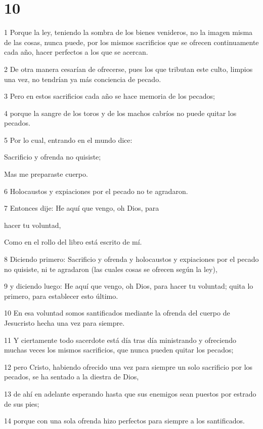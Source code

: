 \chapter{10}

\par 1 Porque la ley, teniendo la sombra de los bienes venideros, no la imagen misma de las cosas, nunca puede, por los mismos sacrificios que se ofrecen continuamente cada año, hacer perfectos a los que se acercan.
\par 2 De otra manera cesarían de ofrecerse, pues los que tributan este culto, limpios una vez, no tendrían ya más conciencia de pecado.
\par 3 Pero en estos sacrificios cada año se hace memoria de los pecados;
\par 4 porque la sangre de los toros y de los machos cabríos no puede quitar los pecados.
\par 5 Por lo cual, entrando en el mundo dice:
\par Sacrificio y ofrenda no quisiste;
\par Mas me preparaste cuerpo.
\par 6 Holocaustos y expiaciones por el pecado no te agradaron.
\par 7 Entonces dije: He aquí que vengo, oh Dios, para
\par hacer tu voluntad,
\par Como en el rollo del libro está escrito de mí.
\par 8 Diciendo primero: Sacrificio y ofrenda y holocaustos y expiaciones por el pecado no quisiste, ni te agradaron (las cuales cosas se ofrecen según la ley),
\par 9 y diciendo luego: He aquí que vengo, oh Dios, para hacer tu voluntad; quita lo primero, para establecer esto último.
\par 10 En esa voluntad somos santificados mediante la ofrenda del cuerpo de Jesucristo hecha una vez para siempre.
\par 11 Y ciertamente todo sacerdote está día tras día ministrando y ofreciendo muchas veces los mismos sacrificios, que nunca pueden quitar los pecados;
\par 12 pero Cristo, habiendo ofrecido una vez para siempre un solo sacrificio por los pecados, se ha sentado a la diestra de Dios,
\par 13 de ahí en adelante esperando hasta que sus enemigos sean puestos por estrado de sus pies;
\par 14 porque con una sola ofrenda hizo perfectos para siempre a los santificados.
